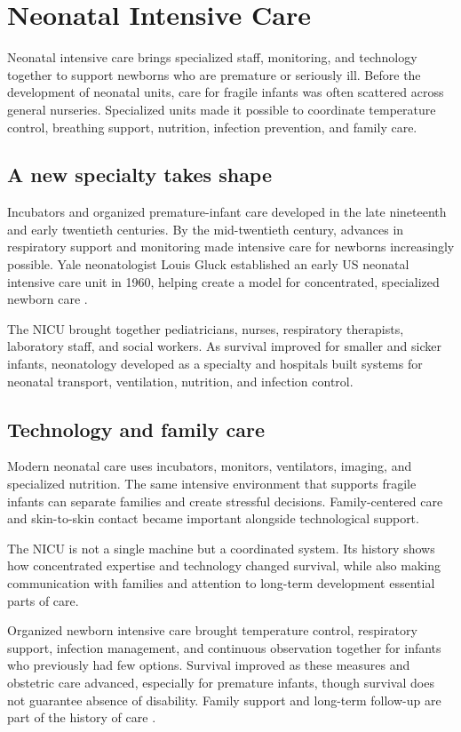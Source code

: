 \documentclass[12pt,oneside]{book}
\begin{document}
\chapter[Neonatal Intensive Care]{Neonatal Intensive Care}

Neonatal intensive care brings specialized staff, monitoring, and technology
together to support newborns who are premature or seriously ill. Before the
development of neonatal units, care for fragile infants was often scattered
across general nurseries. Specialized units made it possible to coordinate
temperature control, breathing support, nutrition, infection prevention, and
family care.

\section{A new specialty takes shape}
Incubators and organized premature-infant care developed in the late nineteenth and early twentieth centuries. By the mid-twentieth century, advances in respiratory support and monitoring made intensive care for newborns increasingly possible. Yale neonatologist Louis Gluck established an early US neonatal intensive care unit in 1960, helping create a model for concentrated, specialized newborn care \cite{yaleNICUHistory,neonatalCareHistory}.

The NICU brought together pediatricians, nurses, respiratory therapists,
laboratory staff, and social workers. As survival improved for smaller and
sicker infants, neonatology developed as a specialty and hospitals built
systems for neonatal transport, ventilation, nutrition, and infection control.

\section{Technology and family care}
Modern neonatal care uses incubators, monitors, ventilators, imaging, and specialized nutrition. The same intensive environment that supports fragile infants can separate families and create stressful decisions. Family-centered care and skin-to-skin contact became important alongside technological support.

The NICU is not a single machine but a coordinated system. Its history shows
how concentrated expertise and technology changed survival, while also making
communication with families and attention to long-term development essential
parts of care.

Organized newborn intensive care brought temperature control, respiratory
support, infection management, and continuous observation together for infants
who previously had few options. Survival improved as these measures and
obstetric care advanced, especially for premature infants, though survival
does not guarantee absence of disability. Family support and long-term
follow-up are part of the history of care
\cite{yaleNICUHistory,neonatalCareHistory}.
\end{document}
